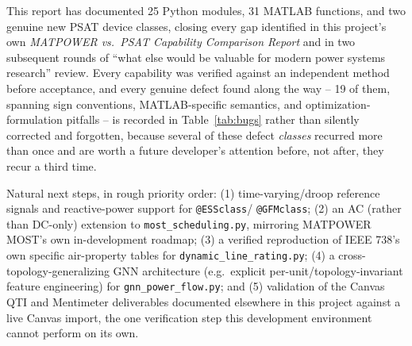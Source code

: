 \documentclass[11pt]{report}
\newcommand{\pkg}[1]{\texttt{#1}}
\theoremstyle{plain}
\theoremstyle{definition}
\theoremstyle{remark}
\begin{document}
This report has documented 25 Python modules, 31 MATLAB functions, and
two genuine new PSAT device classes, closing every gap identified in
this project's own \emph{MATPOWER vs.\ PSAT Capability Comparison
Report} and in two subsequent rounds of ``what else would be valuable
for modern power systems research'' review. Every capability was
verified against an independent method before acceptance, and every
genuine defect found along the way -- 19 of them, spanning sign
conventions, MATLAB-specific semantics, and optimization-formulation
pitfalls -- is recorded in Table~\ref{tab:bugs} rather than silently
corrected and forgotten, because several of these defect \emph{classes}
recurred more than once and are worth a future developer's attention
before, not after, they recur a third time.

Natural next steps, in rough priority order: (1) time-varying/droop
reference signals and reactive-power support for \pkg{@ESSclass}/
\pkg{@GFMclass}; (2) an AC (rather than DC-only) extension to
\pkg{most\_\hspace{0pt}scheduling.py}, mirroring MATPOWER MOST's own in-development
roadmap; (3) a verified reproduction of IEEE 738's own specific
air-property tables for \pkg{dynamic\_\hspace{0pt}line\_\hspace{0pt}rating.py}; (4) a
cross-topology-generalizing GNN architecture (e.g.\ explicit
per-unit/topology-invariant feature engineering) for
\pkg{gnn\_\hspace{0pt}power\_\hspace{0pt}flow.py}; and (5) validation of the Canvas QTI and
Mentimeter deliverables documented elsewhere in this project against a
live Canvas import, the one verification step this development
environment cannot perform on its own.
\end{document}
